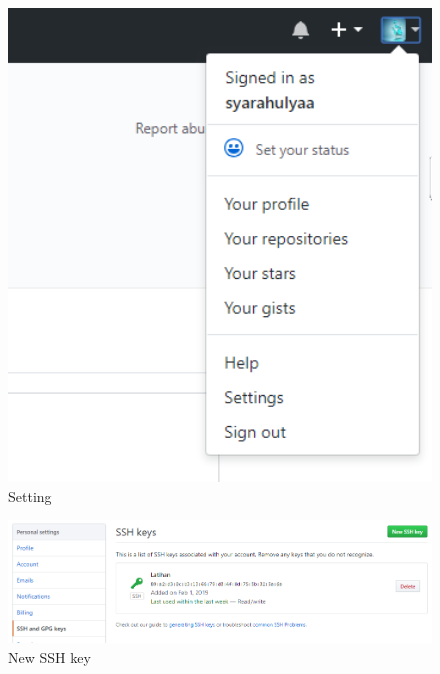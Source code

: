 \begin{enumerate}
\begin{figure}[!htbp]
\centerline{\includegraphics[width=75\textwidth]{Figures/setting.PNG}}
\caption{Setting}
\label{setting}
\end{figure}
\begin{figure}[!htbp]
\centerline{\includegraphics[width=75\textwidth]{Figures/sshkeys.PNG}}
\caption{New SSH key}
\label{sshkeys}
\end{figure}
\end{enumerate}

